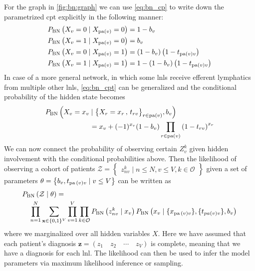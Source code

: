 \documentclass[\relativeRoot/main.tex]{subfiles}
\begin{document}
For the graph in \cref{fig:bn:graph} we can use \cref{eq:bn_cp} to write down the parametrized \gls{cpt} explicitly in the following manner:
%
\begin{equation} \label{eq:bn_cpt}
    \begin{aligned}
        P_\text{BN} \left( X_v = 0 \mid X_{\operatorname{pa}(v)} = 0 \right) &= 1 - b_v \\
        P_\text{BN} \left( X_v = 1 \mid X_{\operatorname{pa}(v)} = 0 \right) &= b_v \\
        P_\text{BN} \left( X_v = 0 \mid X_{\operatorname{pa}(v)} = 1 \right) &= (1 - b_v) \left(1 - t_{\operatorname{pa}(v)v}\right) \\
        P_\text{BN} \left( X_v = 1 \mid X_{\operatorname{pa}(v)} = 1 \right) &= 1 - (1 - b_v) \left(1 - t_{\operatorname{pa}(v)v}\right) 
    \end{aligned}
\end{equation}
%
In case of a more general network, in which some \glspl{lnl} receive efferent lymphatics from multiple other \glspl{lnl}, \cref{eq:bn_cpt} can be generalized and the conditional probability of the hidden state becomes
%
\begin{equation}
    \begin{multlined}[0.7\textwidth]
        P_\text{BN} \left( X_v = x_v \mid \big\{ X_r = x_r \,,\, t_{rv} \big\}_{r \in \pa(v)} , b_v \right) \\
        = x_v + (-1)^{x_v} (1 - b_v) \prod_{r \in \pa(v)}{\left( 1 - t_{rv} \right)}^{x_r}
    \end{multlined}
\end{equation}
%
We can now connect the probability of observing certain $Z_v^k$ given hidden involvement with the conditional probabilities above. Then the likelihood of observing a cohort of patients $\mathcal{Z} = \begin{Bmatrix} z_{nv}^k \mid n \leq N, v \leq V, k \in \mathcal{O} \end{Bmatrix}$ given a set of parameters $\theta = \begin{Bmatrix} b_v, t_{\operatorname{pa}{(v)}v} \mid v \leq V \end{Bmatrix}$ can be written as
%
\begin{equation} \label{eq:bn:likelihood}
    \begin{multlined}[0.85\textwidth]
        P_\text{BN}\left( \mathcal{Z} \mid \theta \right) =\\
        \prod_{n=1}^N{ \sum_{\mathbf{x} \in \{ 0,1 \}^V }{\prod_{v=1}^V{ \prod_{k \in \mathcal{O}}{ P_\text{BN} \left( z_{nv}^k \mid x_v \right) P_\text{BN} \left(  x_v \mid \{ x_{\pa{(v)}v} \}, \{ t_{pa{(v)}v} \}, b_v  \right) } } } }
    \end{multlined}
\end{equation}
%
where we marginalized over all hidden variables $X$. Here we have assumed that each patient's diagnosis $\mathbf{z} = \left( z_1 \quad z_2 \quad \cdots \quad z_V \right)$ is complete, meaning that we have a diagnosis for each \gls{lnl}. The likelihood can then be used to infer the model parameters via maximum likelihood inference or sampling.
\end{document}
